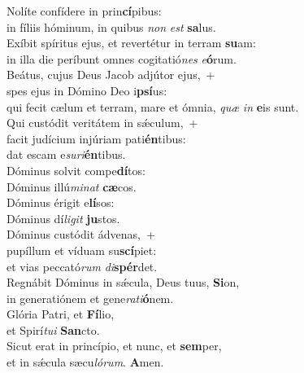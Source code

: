 \evenverse Nolíte confídere in prin\textbf{cí}pibus:~\*\\
\evenverse in fíliis hóminum, in quibus \textit{non} \textit{est} \textbf{sa}lus.\\
\oddverse Exíbit spíritus ejus, et revertétur in terram \textbf{su}am:~\*\\
\oddverse in illa die períbunt omnes cogitatió\textit{nes} \textit{e}\textbf{ó}rum.\\
\evenverse Beátus, cujus Deus Jacob adjútor ejus,~+\\
\evenverse  spes ejus in Dómino Deo i\textbf{psí}us:~\*\\
\evenverse qui fecit cælum et terram, mare et ómnia, \textit{quæ} \textit{in} \textbf{e}is sunt.\\
\oddverse Qui custódit veritátem in sǽculum,~+\\
\oddverse  facit judícium injúriam pati\textbf{én}tibus:~\*\\
\oddverse dat escam e\textit{su}\textit{ri}\textbf{én}tibus.\\
\evenverse Dóminus solvit compe\textbf{dí}tos:~\*\\
\evenverse Dóminus illú\textit{mi}\textit{nat} \textbf{cæ}cos.\\
\oddverse Dóminus érigit e\textbf{lí}sos:~\*\\
\oddverse Dóminus dí\textit{li}\textit{git} \textbf{ju}stos.\\
\evenverse Dóminus custódit ádvenas,~+\\
\evenverse  pupíllum et víduam su\textbf{scí}piet:~\*\\
\evenverse et vias peccató\textit{rum} \textit{di}\textbf{spér}det.\\
\oddverse Regnábit Dóminus in sǽcula, Deus tuus, \textbf{Si}on,~\*\\
\oddverse in generatiónem et gene\textit{ra}\textit{ti}\textbf{ó}nem.\\
\evenverse Glória Patri, et \textbf{Fí}lio,~\*\\
\evenverse et Spirí\textit{tu}\textit{i} \textbf{San}cto.\\
\oddverse Sicut erat in princípio, et nunc, et \textbf{sem}per,~\*\\
\oddverse et in sǽcula sæcu\textit{ló}\textit{rum}. \textbf{A}men.\\
